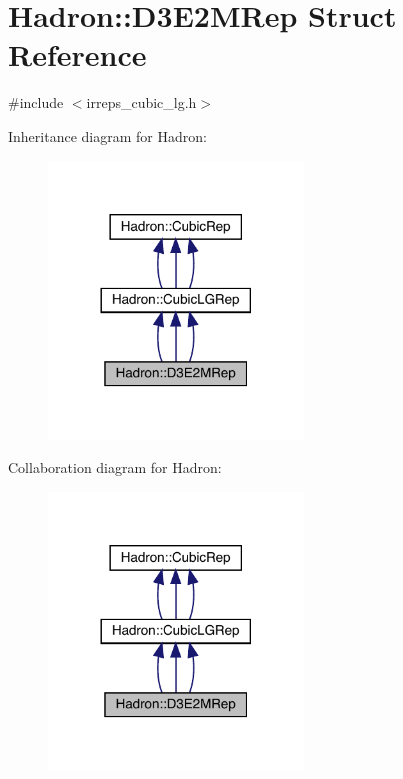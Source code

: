 \hypertarget{structHadron_1_1D3E2MRep}{}\section{Hadron\+:\+:D3\+E2\+M\+Rep Struct Reference}
\label{structHadron_1_1D3E2MRep}


{\ttfamily \#include $<$irreps\+\_\+cubic\+\_\+lg.\+h$>$}



Inheritance diagram for Hadron\+:
\nopagebreak
\begin{figure}[H]
\begin{center}
\leavevmode
\includegraphics[width=192pt]{d2/d04/structHadron_1_1D3E2MRep__inherit__graph}
\end{center}
\end{figure}


Collaboration diagram for Hadron\+:
\nopagebreak
\begin{figure}[H]
\begin{center}
\leavevmode
\includegraphics[width=192pt]{db/d4d/structHadron_1_1D3E2MRep__coll__graph}
\end{center}
\end{figure}
